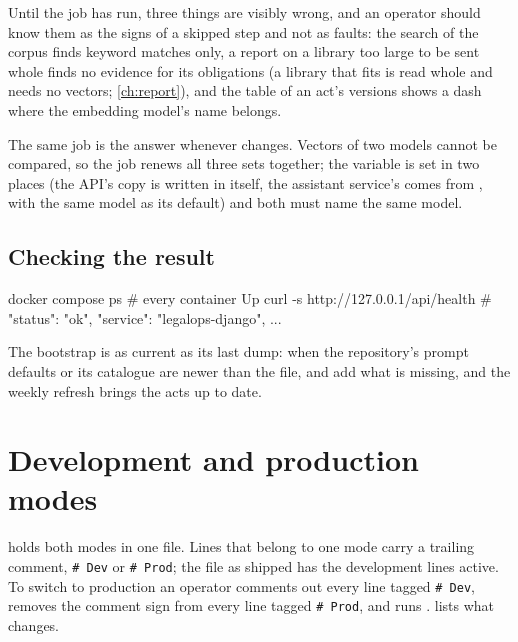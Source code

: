 Until the job has run, three things are visibly wrong, and an operator should know them as
the signs of a skipped step and not as faults: the search of the corpus finds keyword matches
only, a report on a library too large to be sent whole finds no evidence for its obligations
(a library that fits is read whole and needs no vectors; \cref{ch:report}), and the table of an
act's versions
shows a dash where the embedding model's name belongs.

The same job is the answer whenever  changes. Vectors of two models
cannot be compared, so the job renews all three sets together; the variable is set in two
places (the API's copy is written in  itself, the assistant
service's comes from , with the same model as its default) and both must name the same model.

\subsection{Checking the result}

\begin{codeblock}
docker compose ps                       # every container Up
curl -s http://127.0.0.1/api/health     # {"status": "ok", "service": "legalops-django", ...}
\end{codeblock}

The bootstrap is
as current as its last dump: when the repository's prompt defaults or its catalogue are newer
than the file,  and  add what is missing, and the weekly
refresh brings the acts up to date.


\section{Development and production modes}\label{sec:ops:modes}

 holds both modes in one file. Lines that belong to one mode carry a
trailing comment, \texttt{\# Dev} or \texttt{\# Prod}; the file as shipped has the development
lines active. To switch to production an operator comments out every line tagged
\texttt{\# Dev}, removes the comment sign from every line tagged \texttt{\# Prod}, and runs
.  lists what changes.

